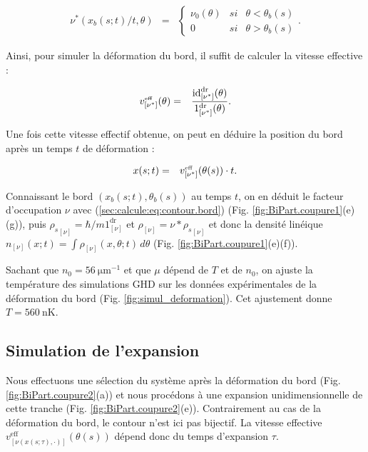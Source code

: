 \begin{eqnarray}
	\label{sec:calcule:eq:contour.bord}
	\nu^\ast(x_b(s;t)/t,\theta) & = & 	 \left \{ \begin{array}{rcl} \nu_0(\theta) & si & \theta < \theta_b(s) \\ 0 & si & \theta > \theta_b(s) \end{array}\right. .	
\end{eqnarray}


 Ainsi, pour simuler la déformation du bord, il suffit de calculer la vitesse effective :

\begin{eqnarray*}
	v_{[\nu^\ast]}^{\mbox{\tiny eff}} ( \theta  ) & = & \frac{\mathrm{id}^{\mathrm{dr}}_{[\nu^\ast]}(\theta)}{\mathrm{1}^{\mathrm{dr}}_{[\nu^\ast]}(\theta)}.
\end{eqnarray*}

Une fois cette vitesse effectif obtenue, on peut en déduire la position du bord après un temps $t$ de déformation :

\begin{eqnarray*}
	x(s;t) & = & v_{[\nu^\ast]}^{\mbox{\tiny eff}} ( \theta(s)  ) \cdot t.	
\end{eqnarray*}

Connaissant le bord $(x_b(s;t) , \theta_b(s) )$ au temps $t$, on en déduit le facteur d’occupation $\nu$ avec (\ref{sec:calcule:eq:contour.bord})  (Fig. \ref{fig:BiPart.coupure1}(e)(g)), puis ${\rho_s}_{[\nu]} = \hbar/m 1^{\mathrm{dr}}_{[\nu]}$ et $\rho_{[\nu]} = \nu \ast {\rho_s}_{[\nu]}$   et donc la densité linéique $n_{[\nu]}(x;t) = \int \rho_{[\nu]}(x ,\theta ;t ) \, d \theta $ (Fig. \ref{fig:BiPart.coupure1}(e)(f)).

Sachant que $n_0 = 56~\mathrm{\mu m}^{-1}$ et que $\mu$ dépend de $T$ et de $n_0$, on ajuste la température des simulations GHD sur les données expérimentales de la déformation du bord (Fig. \ref{fig:simul_deformation}). Cet ajustement donne $T = 560~\mathrm{nK}$.

\subsection{Simulation de l’expansion}

Nous effectuons une sélection du système après la déformation du bord (Fig. \ref{fig:BiPart.coupure2}(a)) et nous procédons à une expansion unidimensionnelle de cette tranche (Fig. \ref{fig:BiPart.coupure2}(e)). Contrairement au cas de la déformation du bord, le contour n’est ici pas bijectif. La vitesse effective $v^{\mathrm{eff}}_{[\nu(x(s;\tau),\cdot)]}(\theta(s))$ dépend donc du temps d’expansion $\tau$.

